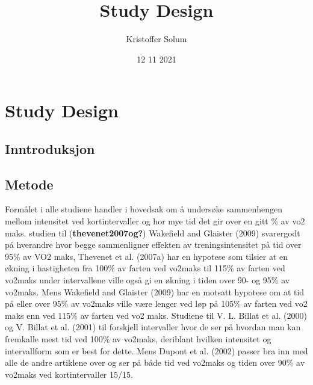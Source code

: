 \documentclass[
]{article}
\title{Study Design}
\author{Kristoffer Solum}
\date{12 11 2021}
\begin{document}
\maketitle

\hypertarget{study-design}{%
\section{Study Design}\label{study-design}}

\hypertarget{inntroduksjon}{%
\subsection{Inntroduksjon}\label{inntroduksjon}}

\hypertarget{metode}{%
\subsection{Metode}\label{metode}}

Formålet i alle studiene handler i hovedsak om å undersøke sammenhengen
mellom intensitet ved kortintervaller og hor mye tid det gir over en
gitt \% av vo2 maks. studien til (\textbf{thevenet2007og?}) Wakefield
and Glaister (2009) svarergodt på hverandre hvor begge sammenligner
effekten av treningsintensitet på tid over 95\% av VO2 maks, Thevenet et
al. (2007a) har en hypotese som tilsier at en økning i hastigheten fra
100\% av farten ved vo2maks til 115\% av farten ved vo2maks under
intervallene ville også gi en økning i tiden over 90- og 95\% av
vo2maks. Mens Wakefield and Glaister (2009) har en motsatt hypotese om
at tid på eller over 95\% av vo2maks ville være lenger ved løp på 105\%
av farten ved vo2 maks enn ved 115\% av farten ved vo2 maks. Studiene
til V. L. Billat et al. (2000) og V. Billat et al. (2001) til forskjell
intervaller hvor de ser på hvordan man kan fremkalle mest tid ved 100\%
av vo2maks, deriblant hvilken intensitet og intervallform som er best
for dette. Mens Dupont et al. (2002) passer bra inn med alle de andre
artiklene over og ser på både tid ved vo2maks og tiden over 90\% av
vo2maks ved kortintervaller 15/15.
\end{document}
